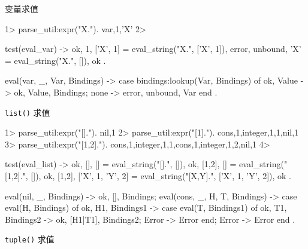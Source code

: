 \documentclass[preview,multi,crop=false,border=1in,class=memoir]{standalone}
\begin{document}
\begin{preview-page}
变量求值

\begin{ErlangShellSession}
1> parse_util:expr("X.").
{var,1,'X'}
2>
\end{ErlangShellSession}



\begin{SourceCode}
test(eval_var) ->
    {ok, 1, [{'X', 1}]} = eval_string("X.", [{'X', 1}]),
    {error, {unbound, 'X'}} = eval_string("X.", []),
    ok
.
\end{SourceCode}


\begin{SourceCode}
eval({var, _, Var}, Bindings) ->
    case bindings:lookup(Var, Bindings) of
        {ok, Value} ->
            {ok, Value, Bindings};
        none ->
            {error, {unbound, Var}}
    end
.
\end{SourceCode}


\verb|list()| 求值

\begin{ErlangShellSession}
1> parse_util:expr("[].").
{nil,1}
2> parse_util:expr("[1].").
{cons,1,{integer,1,1},{nil,1}}
3> parse_util:expr("[1,2].").
{cons,1,{integer,1,1},{cons,1,{integer,1,2},{nil,1}}}
4>
\end{ErlangShellSession}


\begin{SourceCode}
test(eval_list) ->
    {ok, [], []} = eval_string("[].", []),
    {ok, [1,2], []} = eval_string("[1,2].", []),
    {ok, [1,2], [{'X', 1}, {'Y', 2}]} = eval_string("[X,Y].", [{'X', 1}, {'Y', 2}]),
    ok
.
\end{SourceCode}

\begin{SourceCode}
eval({nil, _}, Bindings) ->
    {ok, [], Bindings};
eval({cons, _, H, T}, Bindings) ->
    case eval(H, Bindings) of
        {ok, H1, Bindings1} ->
            case eval(T, Bindings1) of
                {ok, T1, Bindings2} ->
                    {ok, [H1|T1], Bindings2};
                Error ->
                    Error
            end;
        Error ->
            Error
    end
.
\end{SourceCode}

\verb|tuple()| 求值


\end{preview-page}
\end{document}
